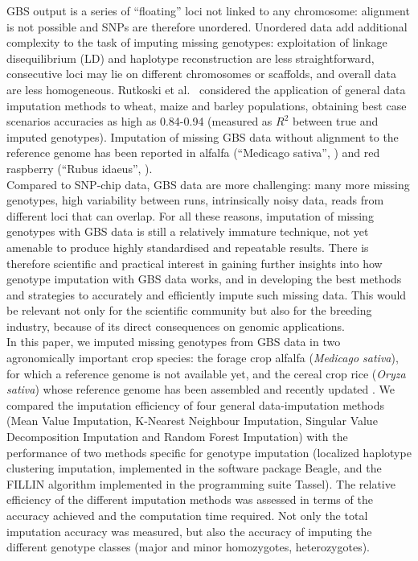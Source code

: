 GBS output is a series of ``floating'' loci not linked to any chromosome: 
alignment is not possible and SNPs are therefore unordered. Unordered 
data add additional complexity to the task of imputing missing genotypes: 
exploitation of linkage disequilibrium (LD) and haplotype reconstruction 
are less straightforward, consecutive loci may lie on different chromosomes
or scaffolds, and overall data are less homogeneous. Rutkoski et al.~\cite{rutkoski_imputation_2013}
considered the application of general data imputation methods 
to wheat, maize and barley populations, obtaining best case scenarios accuracies 
as high as 0.84-0.94 (measured as $R^{2}$ between true and imputed genotypes). Imputation of missing GBS data without alignment to the reference genome has been reported in alfalfa (``Medicago sativa'', \cite{Rocher_validation_2015}) and red raspberry (``Rubus idaeus'', \cite{ward2013}).\\
Compared to SNP-chip data, GBS data are more challenging: many more 
missing genotypes, high variability between runs, intrinsically noisy data, 
reads from different loci that can overlap. For all these reasons, imputation 
of missing genotypes with GBS data is still a relatively immature technique, 
not yet amenable to produce highly standardised and repeatable results. 
There is therefore scientific and practical interest in gaining further 
insights into how genotype imputation with GBS data works, and in 
developing the best methods and strategies to accurately and efficiently 
impute such missing data. This would be relevant not only for the scientific 
community but also for the breeding industry, because of its direct 
consequences on genomic applications.\\
In this paper, we imputed missing genotypes from GBS data in two agronomically
important crop species: the forage crop alfalfa (\emph{Medicago sativa}), for 
which a reference genome is not available yet, and the 
cereal crop rice (\emph{Oryza sativa}) whose reference genome has been 
assembled \cite{international_rice_genome_sequencing_project_map-based_2005} and
recently updated \cite{kawahara_improvement_2013}. We compared the imputation 
efficiency of four general data-imputation methods (Mean Value Imputation, 
K-Nearest Neighbour Imputation, Singular Value Decomposition Imputation 
and Random Forest Imputation) with the performance of two methods specific 
for genotype imputation (localized haplotype clustering imputation, 
implemented in the software package Beagle, %
and the FILLIN algorithm implemented in the programming suite Tassel). The relative efficiency of 
the different imputation methods was assessed in terms of the 
accuracy achieved and the computation time required. Not only the total imputation accuracy was measured, but also the accuracy of imputing the different genotype classes (major and minor homozygotes, heterozygotes).\\
